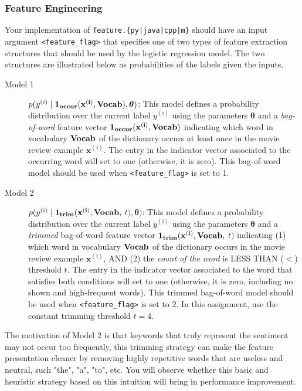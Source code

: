 \documentclass[11pt]{exam}
\numberwithin{equation}{section} %
\numberwithin{figure}{section} %
\numberwithin{table}{section} %
\def\x{\mathbf x}
\newcommand{\thetav     }{\boldsymbol \theta     }
\begin{document}
\subsubsection{Feature Engineering} \label{feature}

Your implementation of \texttt{feature.\{py|java|cpp|m\}} should have an input argument \texttt{<feature\_flag>} that specifies one of two types of feature extraction structures that should be used by the logistic regression model. The two structures are illustrated below as probabilities of the labels given the inputs.

\begin{description}
    \item[Model 1] $p(y^{(i)} \mid \bf{1}_{occur}( \x^{(i)},Vocab), \thetav)$: This model defines a probability distribution over the current label $y^{(i)}$ using the parameters $\thetav$ and a \emph{bag-of-word} feature vector $\bf{1}_{occur}( \x^{(i)},Vocab)$ indicating which word in vocabulary $\bf{Vocab}$ of the dictionary occurs at least once in the movie review example $\x^{(i)}$. The entry in the indicator vector associated  to the occurring word will set to one (otherwise, it is zero). This bag-of-word model should be used when \texttt{<feature\_flag>} is set to 1.
    
    \item[Model 2] $p(y^{(i)} \mid \bf{1}_{trim}(  \x^{(i)},Vocab,$ $t), \thetav)$: This model defines a probability distribution over the current label $y^{(i)}$ using the parameters $\thetav$ and a \emph{trimmed} bag-of-word feature vector $\bf{1}_{trim}( \x^{(i)},Vocab,$ $t)$ indicating  (1) which word in vocabulary $\bf{Vocab}$ of the dictionary occurs in the movie review example $\x^{(i)}$, AND (2) the \emph{count of the word} is LESS THAN ($<$) threshold $t$. The entry in the indicator vector associated  to the word that satisfies both conditions will set to one (otherwise, it is zero, including no shown and high-frequent words). This trimmed bag-of-word model should be used when \texttt{<feature\_flag>} is set to 2. In this assignment, use the constant trimming threshold $t=4$.
    
\end{description}

The motivation of Model 2 is that keywords that truly represent the sentiment may not occur too frequently, this trimming strategy can make the feature presentation cleaner by removing highly repetitive words that are useless and neutral, such "the", "a", "to", etc. You will observe whether this basic and heuristic strategy based on this intuition will bring in performance improvement.
\end{document}
